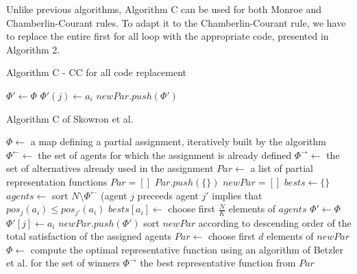 Unlike previous algorithms, Algorithm C can be used for both Monroe and Chamberlin-Courant rules. To adapt it to the Chamberlin-Courant rule, we have to replace the entire first for all loop with the appropriate code, presented in Algorithm 2.

\begin{algorithm}
\caption{Algorithm C - CC for all code replacement}\label{euclid}
\begin{algorithmic}[1]
		\State $\Phi' \gets \Phi$
				\State $\Phi'(j) \gets a_{i}$
			\EndIf
		\EndFor
		\State $newPar.push(\Phi')$
	\EndFor
\end{algorithmic}
\end{algorithm}

\begin{algorithm}
\caption{Algorithm C of Skowron et al. \cite{1}}\label{euclid}
\begin{algorithmic}[1]
		\State $\Phi \gets$ a map defining a partial assignment, iteratively built by the algorithm
		\State $\Phi^{\leftarrow} \gets$ the set of agents for which the assignment is already defined
		\State $\Phi^{\rightarrow} \gets$ the set of alternatives already used in the assignment
		\State $Par \gets$ a list of partial representation functions
		\State $Par = []$
		\State $Par.push(\{\})$
			\State $newPar = []$
				\State $bests \gets \{\}$
					\State $agents \gets$ sort $N \setminus \Phi^{\leftarrow}$ (agent $j$ preceeds agent $j'$ implies that $pos_{j}(a_{i}) \leq pos_{j'}(a_{i})$
					\State $bests[a_{i}] \gets$ choose first $\frac{N}{K}$ elements of $agents$
					\State $\Phi' \gets \Phi$
						\State $\Phi'[j] \gets a_{i}$
					\EndFor
					\State $newPar.push(\Phi')$
				\EndFor
			\EndFor
			\State sort $newPar$ according to descending order of the total satisfaction of the assigned agents
			\State $Par \gets$ choose first $d$ elements of $newPar$
		\EndFor
			\State $\Phi \gets$ compute the optimal representative function using an algorithm of Betzler et al. \cite{3} for the set of winners $\Phi^{\rightarrow}$
		\EndFor
		\State \Return the best representative function from $Par$
	\EndProcedure
\end{algorithmic}
\end{algorithm}

